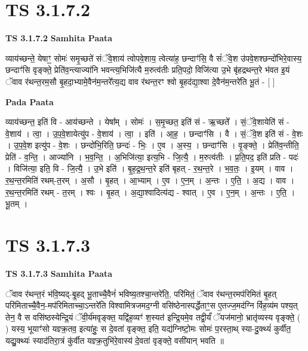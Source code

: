 \documentclass[17pt]{extarticle}
\begin{document}

\section{ TS 3.1.7.2 }

\textbf{TS 3.1.7.2 } \newline
\textbf{Samhita Paata} \newline

व्याय॑च्छन्ते॒ येषाꣳ॒॒ सोमः॑ समृ॒च्छते॑ संॅवे॒शाय॑ त्वोपवे॒शाय॒ त्वेत्या॑ह॒ छन्दाꣳ॑सि॒ वै सं॑ॅवे॒श उ॑पवे॒शश्छन्दो॑भिरे॒वास्य॒ छन्दाꣳ॑सि वृङ्क्ते॒ प्रेति॑व॒न्त्याज्या॑नि भवन्त्य॒भिजि॑त्यै म॒रुत्व॑तीः प्रति॒पदो॒ विजि॑त्या उ॒भे बृ॑हद्रथन्त॒रे भ॑वत इ॒यं ॅवाव र॑थन्त॒रम॒सौ बृ॒हदा॒भ्यामे॒वैन॑म॒न्तरे᳚त्य॒द्य वाव र॑थन्त॒रꣳ श्वो बृ॒हद॑द्या॒श्वा दे॒वैन॑म॒न्तरे॑ति भू॒तं - [  ] \newline

\textbf{Pada Paata} \newline

व्याय॑च्छन्त॒ इति॑ वि - आय॑च्छन्ते । येषा᳚म् । सोमः॑ । स॒मृ॒च्छत॒ इति॑ सं - ऋ॒च्छते᳚ । सं॒ॅवे॒शायेति॑ सं - वे॒शाय॑ । त्वा॒ । उ॒प॒वे॒शायेत्यु॑प - वे॒शाय॑ । त्वा॒ । इति॑ । आ॒ह॒ । छन्दाꣳ॑सि । वै । सं॒ॅवे॒श इति॑ सं - वे॒शः । उ॒प॒वे॒श इत्यु॑प - वे॒शः । छन्दो॑भि॒रिति॒ छन्दः॑ - भिः॒ । ए॒व । अ॒स्य॒ । छन्दाꣳ॑सि । वृ॒ङ्क्ते॒ । प्रेति॑व॒न्तीति॒ प्रेति॑ - व॒न्ति॒ । आज्या॑नि । भ॒व॒न्ति॒ । अ॒भिजि॑त्या॒ इत्य॒भि - जि॒त्यै॒ । म॒रुत्व॑तीः । प्र॒ति॒पद॒ इति॑ प्रति - पदः॑ । विजि॑त्या॒ इति॒ वि - जि॒त्यै॒ । उ॒भे इति॑ । बृ॒ह॒द्र॒थ॒न्त॒रे इति॑ बृहत् - र॒थ॒न्त॒रे । भ॒व॒तः॒ । इ॒यम् । वाव । र॒थ॒न्त॒रमिति॑ रथम्-त॒रम् । अ॒सौ । बृ॒हत् । आ॒भ्याम् । ए॒व । ए॒न॒म् । अ॒न्तः । ए॒ति॒ । अ॒द्य । वाव । र॒थ॒न्त॒रमिति॑ रथम् - त॒रम् । श्वः । बृ॒हत् । अ॒द्या॒श्वादित्य॑द्य - श्वात् । ए॒व । ए॒न॒म् । अ॒न्तः । ए॒ति॒ । भू॒तम् ।  \newline





\section{ TS 3.1.7.3 }

\textbf{TS 3.1.7.3 } \newline
\textbf{Samhita Paata} \newline

ॅवाव र॑थन्त॒रं भ॑वि॒ष्यद्-बृ॒॒हद् भू॒ताच्चै॒वैनं॑ भविष्य॒तश्चा॒न्तरे॑ति॒, परि॑मितं॒ ॅवाव र॑थन्त॒रमप॑रिमितं बृ॒हत् परि॑मिताच्चै॒वैन॒-मप॑रिमिताच्चा॒ऽन्तरे॑ति विश्वामित्रजमद॒ग्नी वसि॑ष्ठेनास्पर्द्धेताꣳ॒॒स ए॒तज्ज॒मद॑ग्नि र्विह॒व्य॑म पश्य॒त् तेन॒ वै स वसि॑ष्ठस्येन्द्रि॒यं ॅवी॒र्य॑मवृङ्क्त॒ यद्वि॑ह॒व्यꣳ॑ श॒स्यत॑ इन्द्रि॒यमे॒व तद्वी॒र्यं॑ ॅयज॑मानो॒ भ्रातृ॑व्यस्य वृङ्क्ते॒ ( ) यस्य॒ भूयाꣳ॑सो यज्ञ्क्र॒तव॒ इत्या॑हुः॒ स दे॒वता॑ वृङ्क्त॒ इति॒ यद्य॑ग्निष्टो॒मः सोमः॑ प॒रस्ता॒थ् स्या-दु॒क्थ्यं॑ कुर्वीत॒ यद्यु॒क्थ्यः॑ स्याद॑तिरा॒त्रं कु॑र्वीत यज्ञ्क्र॒तुभि॑रे॒वास्य॑ दे॒वता॑ वृङ्क्ते॒ वसी॑यान् भवति ॥ \newline
\end{document}
